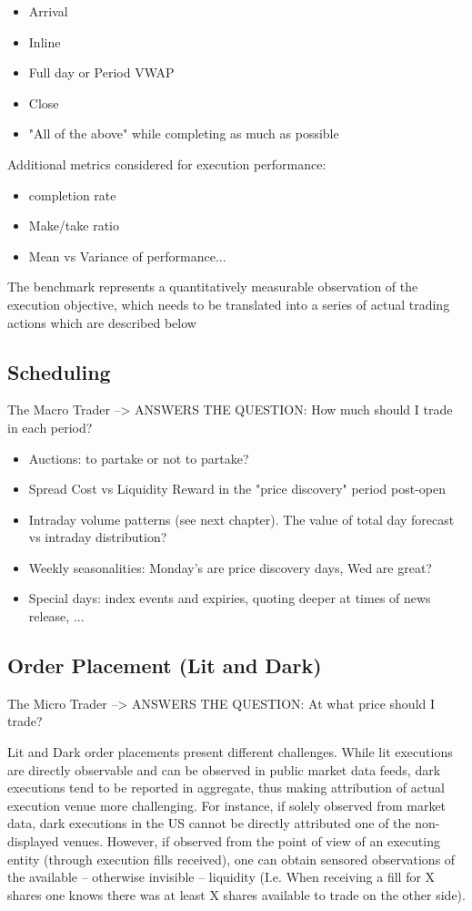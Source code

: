 \begin{itemize}
\item Arrival
\item Inline
\item Full day or Period VWAP
\item Close
\item "All of the above" while completing as much as possible
\end{itemize}

Additional metrics considered for execution performance:
\begin{itemize}
\item completion rate
\item Make/take ratio
\item Mean vs Variance of performance...
\end{itemize}

The benchmark represents a quantitatively measurable observation of the execution objective, which needs to be translated into a series of actual trading actions which are described below


\subsection{Scheduling}

The Macro Trader --> ANSWERS THE QUESTION: How much should I trade in each period?

\begin{itemize}
\item Auctions: to partake or not to partake?
\item Spread Cost vs Liquidity Reward in the "price discovery" period post-open
\item Intraday volume patterns (see next chapter). The value of total day forecast vs intraday distribution?
\item Weekly seasonalities: Monday's are price discovery days, Wed are great?
\item Special days: index events and expiries, quoting deeper at times of news release, ...
\end{itemize}


\subsection{Order Placement (Lit and Dark)}

The Micro Trader --> ANSWERS THE QUESTION: At what price should I trade?

Lit and Dark order placements present different challenges. While lit executions are directly observable and can be observed in public market data feeds, dark executions tend to be reported in aggregate, thus making attribution of actual execution venue more challenging. For instance, if solely observed from market data, dark executions in the US cannot be directly attributed one of the non-displayed venues. However, if observed from the point of view of an executing entity (through execution fills received), one can obtain sensored observations of the available -- otherwise invisible -- liquidity (I.e. When receiving a fill for X shares one knows there was at least X shares available to trade on the other side).

